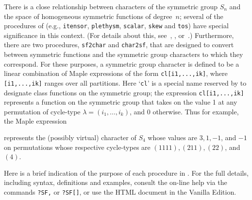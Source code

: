 There is a close relationship between characters of the symmetric
group $S_n$ and the space of homogeneous symmetric functions of degree~$n$;
several of the procedures of \SF{} (e.g., {\tt itensor}, {\tt plethysm},
{\tt scalar}, {\tt skew} and {\tt tos}) have special significance in this
context. (For details about this, see~\cite{5}, \cite{6}, or~\cite{7}.)
Furthermore, there are two procedures, {\tt sf2char} and {\tt char2sf},
that are designed to convert between symmetric functions and the symmetric
group characters to which they correspond. For these purposes, a symmetric
group character is defined to be a linear combination of Maple expressions
of the form {\tt cl[i\ul{}1,...,i\ul{}k]}, where {\tt [i\ul{}1,...,i\ul{}k]}
ranges over all partitions. Here `{\tt cl}' is a special name reserved by
\SF{} to designate class functions on the symmetric group; the
expression {\tt cl[i\ul{}1,...,i\ul{}k]} represents a function on the
symmetric group that takes on the value 1 at any permutation of cycle-type
$\lambda=(i_1,\ldots,i_k)$, and 0 otherwise. Thus for example, the Maple
expression


\noindent represents the (possibly virtual) character of $S_4$ whose
values are $3,1,-1$, and $-1$ on permutations whose respective cycle-types
are $(1111),(211),(22)$, and $(4)$.

Here is a brief indication of the purpose of each procedure in \SF.
For the full details, including syntax, definitions and examples, consult
the on-line help via the commands {\tt ?SF,} or
{\tt ?SF[]}, or use the HTML document
in the Vanilla Edition.

